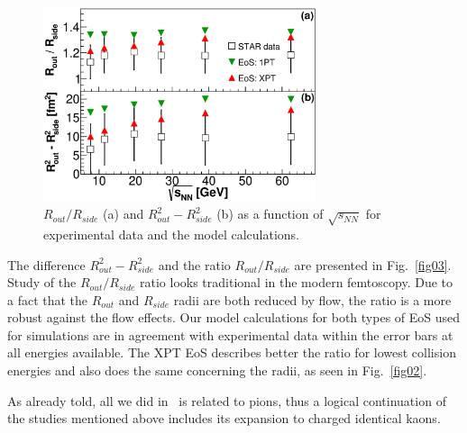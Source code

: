 \documentclass[a4paper]{panl}
\begin{document}
  \begin{figure}[t]
    \begin{center}
      \includegraphics[width=80mm]{fig3.eps}
      \vspace{-3mm}
      \caption{$R_{out} / R_{side}$ (a) and $R^{2}_{out} - R^{2}_{side}$ (b) as a function of $\sqrt{s_{NN}}$ for experimental data and the model calculations.}
    \end{center}
    \vspace{-5mm}
  \end{figure}
  
  The difference $R^{2}_{out} - R^{2}_{side}$ and the ratio $R_{out} / R_{side}$ are presented in Fig.~\ref{fig03}. Study of the $R_{out} / R_{side}$ ratio looks traditional in
  the modern femtoscopy. Due to a fact that the $R_{out}$ and $R_{side}$ radii are both reduced by flow, the ratio is a more robust against the flow effects.
  Our model calculations for both types of EoS used for simulations are in agreement with experimental data within the error bars at all energies available.
  The XPT EoS describes better the ratio for lowest collision energies and also does the same concerning the radii, as seen in Fig.~\ref{fig02}.

  As already told, all we did in~\cite{Batyuk:2017smw} is related to pions, thus a logical continuation of the studies mentioned above includes its expansion to charged identical kaons.
  
\end{document}
